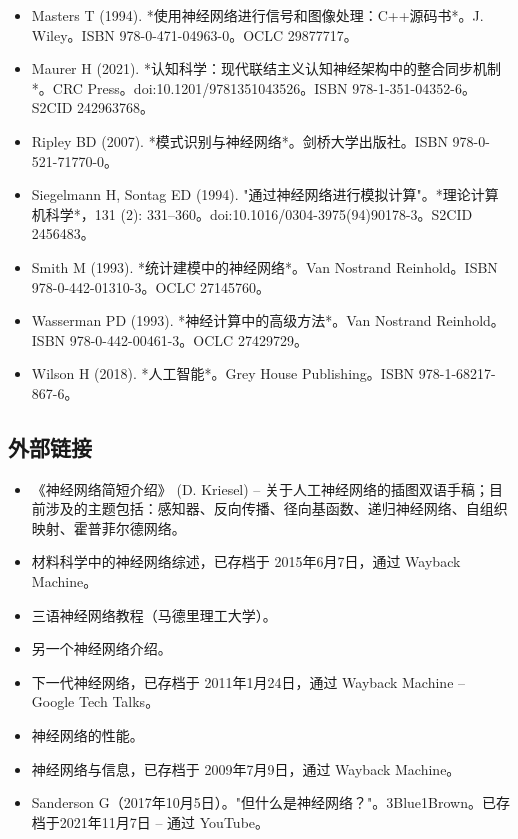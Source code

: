 \begin{itemize}
\item Masters T (1994). *使用神经网络进行信号和图像处理：C++源码书*。J. Wiley。ISBN 978-0-471-04963-0。OCLC 29877717。  
\item Maurer H (2021). *认知科学：现代联结主义认知神经架构中的整合同步机制*。CRC Press。doi:10.1201/9781351043526。ISBN 978-1-351-04352-6。S2CID 242963768。  
\item Ripley BD (2007). *模式识别与神经网络*。剑桥大学出版社。ISBN 978-0-521-71770-0。
\item Siegelmann H, Sontag ED (1994). "通过神经网络进行模拟计算"。*理论计算机科学*，131 (2): 331–360。doi:10.1016/0304-3975(94)90178-3。S2CID 2456483。  
\item Smith M (1993). *统计建模中的神经网络*。Van Nostrand Reinhold。ISBN 978-0-442-01310-3。OCLC 27145760。  
\item Wasserman PD (1993). *神经计算中的高级方法*。Van Nostrand Reinhold。ISBN 978-0-442-00461-3。OCLC 27429729。  
\item Wilson H (2018). *人工智能*。Grey House Publishing。ISBN 978-1-68217-867-6。
\end{itemize}
\subsection{外部链接}
\begin{itemize}
\item 《神经网络简短介绍》 (D. Kriesel) – 关于人工神经网络的插图双语手稿；目前涉及的主题包括：感知器、反向传播、径向基函数、递归神经网络、自组织映射、霍普菲尔德网络。
\item 材料科学中的神经网络综述，已存档于 2015年6月7日，通过 Wayback Machine。
\item 三语神经网络教程（马德里理工大学）。
\item 另一个神经网络介绍。
\item 下一代神经网络，已存档于 2011年1月24日，通过 Wayback Machine – Google Tech Talks。
\item 神经网络的性能。
\item 神经网络与信息，已存档于 2009年7月9日，通过 Wayback Machine。
\item Sanderson G（2017年10月5日）。"但什么是神经网络？"。3Blue1Brown。已存档于2021年11月7日 – 通过 YouTube。
\end{itemize}

